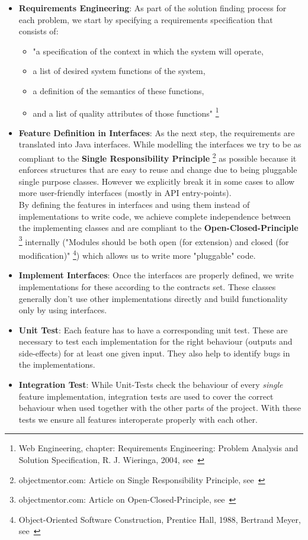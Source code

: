 \begin{itemize}
	\item \textbf{Requirements Engineering}: As part of the solution finding process for each problem, we start by specifying a requirements specification that consists of:
	\begin{itemize}
		\item "a specification of the context in which the system will operate,
		\item a list of desired system functions of the system,
		\item a definition of the semantics of these functions,
		\item and a list of quality attributes of those functions" \footnote{Web Engineering, chapter: Requirements Engineering: Problem Analysis and Solution Specification, R. J. Wieringa, 2004, see~\cite{requirements_engineering}}
	\end{itemize}
	\item \textbf{Feature Definition in Interfaces}: As the next step, the requirements are translated into Java interfaces.	While modelling the interfaces we try to be as compliant to the \textbf{Single Responsibility Principle} \footnote{objectmentor.com: Article on Single Responsibility Principle, see~\cite{singleresponsibility_objectmentor}} as possible because it enforces structures that are easy to reuse and change due to being pluggable single purpose classes. However we explicitly break it in some cases to allow more user-friendly interfaces (mostly in API entry-points).
	\\
	By defining the features in interfaces and using them instead of implementations to write code, we achieve complete independence between the implementing classes and are compliant to the \textbf{Open-Closed-Principle} \footnote{	objectmentor.com: Article on Open-Closed-Principle, see~\cite{openclosed_objectmentor}} internally ("Modules should be both open (for extension) and closed (for modification)" \footnote{Object-Oriented Software Construction, Prentice Hall, 1988, Bertrand Meyer, see~\cite{openclosed_bertrand}}) which allows us to write more "pluggable" code.
	\item \textbf{Implement Interfaces}: Once the interfaces are properly defined, we write implementations for these according to the contracts set. These classes generally don't use other implementations directly and build functionality only by using interfaces.
	\item \textbf{Unit Test}: Each feature has to have a corresponding unit test. These are necessary to test each implementation for the right behaviour (outputs and side-effects) for at least one given input. They also help to identify bugs in the implementations.
	\item \textbf{Integration Test}: While Unit-Tests check the behaviour of every \textit{single} feature implementation, integration tests are used to cover the correct behaviour when used together with the other parts of the project. With these tests we ensure all features interoperate properly with each other.
\end{itemize}
